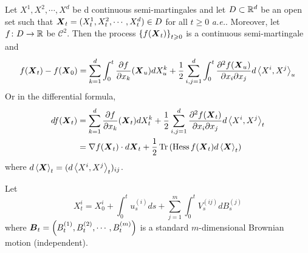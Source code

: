 \documentclass[a4paper,12pt]{article}
\begin{document}
\begin{itemize}
  \begin{thm}
    Let $X^1,X^2,\cdots,X^d$ be d continuous semi-martingales and let $D \subset \mathbb{R}^d$ be an open set such that $\boldsymbol{X}_t = (X^1_t,X^2_t,\cdots,X^d_t) \in D$ for all $t \geqslant 0$ \emph{a.e.}. Moreover, let $f \colon D \rightarrow \mathbb{R}$ be $\mathcal{C}^2$. Then the process $\left\{f(\boldsymbol{X}_t)\right\}_{t \geqslant 0}$ is a continuous semi-martingale and
    \begin{equation*}
      f(\boldsymbol{X}_t)- f(\boldsymbol{X}_0) = \sum_{k=1}^d\int_0^t\frac{\partial f}{\partial x_k}(\boldsymbol{X}_u)dX_u^k + \frac{1}{2}\sum_{i,j=1}^d\int_0^t \frac{\partial^2 f(\boldsymbol{X}_u)}{\partial x_i \partial x_j}d \left\langle X^i,X^j \right\rangle_u
    \end{equation*}
    Or in the differential formula,
    \begin{equation*}
      \begin{aligned}
        df(\boldsymbol{X}_t) &= \sum_{k=1}^d \frac{\partial f}{\partial x_k}(\boldsymbol{X}_t)dX_t^k + \frac{1}{2}\sum_{i,j=1}^d \frac{\partial^2 f(\boldsymbol{X}_t)}{\partial x_i \partial x_j}d \left\langle X^i,X^j \right\rangle_t\\
        &=\nabla f(\boldsymbol{X}_t) \cdot d\boldsymbol{X}_t + \frac{1}{2}\operatorname{Tr}\left(\operatorname{Hess}f(\boldsymbol{X}_t)d\left\langle \boldsymbol{X} \right\rangle_t\right)
      \end{aligned}
    \end{equation*}
    where $d\left\langle \boldsymbol{X} \right\rangle_t = (d\left\langle X^i,X^j \right\rangle_t)_{ij}$.
  \end{thm}
  \begin{exam}
    Let
    \begin{equation*}
      X_t^i = X_0^i + \int_0^tu_s^{(i)}ds + \sum_{j=1}^m\int_0^t V^{(ij)}_sdB_s^{(j)}
    \end{equation*}
    where $\boldsymbol{B}_t = \left(B^{(1)}_t,B^{(2)}_t,\cdots,B^{(m)}_t\right)$ is a standard $m$-dimensional Brownian motion (independent).
    

\end{exam}
\end{itemize}
\end{document}
